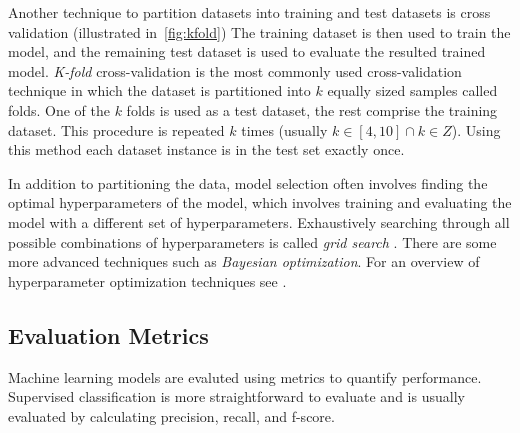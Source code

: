 Another technique to partition datasets into training and test datasets
is cross validation \citep{arlot2010survey} (illustrated in~\ref{fig:kfold})
The training dataset is then used to train the model, and the remaining
test dataset is used to evaluate the resulted trained model. 
\textit{K-fold} cross-validation is the most commonly used
cross-validation technique in which the dataset is partitioned into 
$k$ equally sized samples called folds. One of the $k$ folds is
used as a test dataset, the rest comprise the training dataset. This
procedure is repeated $k$ times (usually $k \in [4, 10] \cap k \in Z$).
Using this method each dataset instance is in the test set 
exactly once. 

In addition to partitioning the data, model selection often involves finding
the optimal hyperparameters of the model, which involves  training and
evaluating the model with a different set of hyperparameters.  Exhaustively
searching through all possible combinations of hyperparameters is called
\textit{grid search} \citep{bergstra2012random}. There are some more advanced
techniques such as \textit{Bayesian optimization}.  For an overview of
hyperparameter optimization techniques see \citep{snoek2012practical}.

\subsection{Evaluation Metrics}
\label{sec:metrics}

Machine learning models are evaluted using metrics to quantify
performance. Supervised classification is more straightforward 
to evaluate and is usually evaluated by calculating  
precision, recall, and f-score. 

